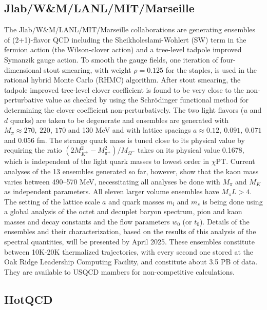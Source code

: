 \documentclass[a4paper,11pt]{article}
\begin{document}
\subsection{Jlab/W\&M/LANL/MIT/Marseille}
The Jlab/W\&M/LANL/MIT/Marseille collaborations are generating
ensembles of (2+1)-flavor QCD including the Sheikholeslami-Wohlert
(SW) term in the fermion action (the Wilson-clover action) and a
tree-level tadpole improved Symanzik gauge action. To smooth the gauge
fields, one iteration of four-dimensional stout smearing, with weight
$\rho = 0.125$ for the staples, is used in the rational hybrid Monte
Carlo (RHMC) algorithm.  After stout smearing, the tadpole improved
tree-level clover coefficient is found to be very close to the
non-perturbative value as checked by using the Schr\"odinger
functional method for determining the clover coefficient
non-perturbatively. The two light flavors ($u$ and $d$ quarks) are
taken to be degenerate and ensembles are generated with $M_\pi \approx
270,\ 220,\ 170$ and 130 MeV and with lattice spacings $a \approx
0.12,\ 0.091,\ 0.071$ and 0.056 fm. The strange quark mass is tuned
close to its physical value by requiring the ratio $(2M_{K^+}^2 -
M_{\pi^+}^2)/M_{\Omega^-}$ takes on its physical value 0.1678, which
is independent of the light quark masses to lowest order in
$\chi$PT. Current analyses of the 13 ensembles generated so far,
however, show that the kaon mass varies between 490--570 MeV,
necessitating all analyses be done with $M_\pi$ and $M_K$ as
independent parameters.  All eleven larger volume ensembles have
$M_\pi L > 4$.  The setting of the lattice scale $a$ and quark masses
$m_l$ and $m_s$ is being done using a global analysis of the octet and
decuplet baryon spectrum, pion and kaon masses and decay constants and
the flow parameters $w_0$ (or $t_0$). Details of the ensembles and
their characterization, based on the results of this analysis of the
spectral quantities, will be presented by April 2025. These ensembles
constitute between 10K-20K thermalized trajectories, with every second
one stored at the Oak Ridge Leadership Computing Facility, and
constitute about 3.5 PB of data. They are available to USQCD mambers
for non-competitive calculations.

\newpage
\subsection{HotQCD}
\end{document}
